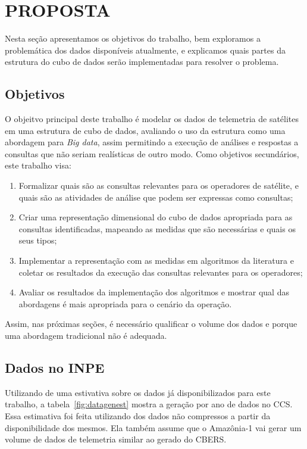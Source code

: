 
\chapter{PROPOSTA}\label{ch:prop}

Nesta seção apresentamos os objetivos do trabalho, bem exploramos a problemática dos dados disponíveis atualmente, e explicamos quais partes da estrutura do cubo de dados serão implementadas para resolver o problema.
\section{Objetivos}\label{ch:prop:obj}

O objeitvo principal deste trabalho é modelar os dados de telemetria de satélites em uma estrutura de cubo de dados, avaliando o uso da estrutura como uma abordagem para \textit{Big data}, assim permitindo a execução de análises e respostas a consultas que não seriam realísticas de outro modo. Como objetivos secundários, este trabalho visa:

\begin{enumerate}
\item Formalizar quais são as consultas relevantes para os operadores de satélite, e quais são as atividades de análise que podem ser expressas como consultas;
\item Criar uma representação dimensional do cubo de dados apropriada para as consultas identificadas, mapeando as medidas que são necessárias e quais os seus tipos;
\item Implementar a representação com as medidas em algoritmos da literatura e coletar os resultados da execução das consultas relevantes para os operadores;
\item Avaliar os resultados da implementação dos algoritmos e mostrar qual das abordagens é mais apropriada para o cenário da operação.
\end{enumerate}

Assim, nas próximas seções, é necessário qualificar o volume dos dados e porque uma abordagem tradicional não é adequada.

\section{Dados no INPE}\label{ch:prop:data}

Utilizando de uma estivativa sobre os dados já disponibilizados para este trabalho, a tabela~\ref{fig:datagenest} mostra a geração por ano de dados no CCS.
Essa estimativa foi feita utilizando dos dados não compressos a partir da disponibilidade dos mesmos.
Ela também assume que o Amazônia-1 vai gerar um volume de dados de telemetria similar ao gerado do CBERS.

